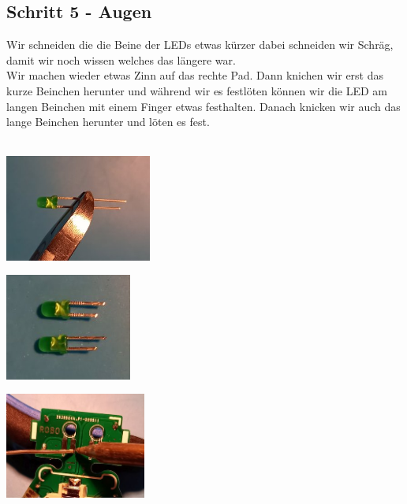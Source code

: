 \documentclass[a4paper]{article}
\begin{document}
\subsection{Schritt 5 - Augen}
Wir schneiden die die Beine der LEDs etwas kürzer dabei schneiden wir Schräg, damit wir noch wissen welches das längere war.\\ Wir machen wieder etwas Zinn auf das rechte Pad. Dann knichen wir erst das kurze Beinchen herunter und während wir es festlöten können wir die LED am langen Beinchen mit einem Finger etwas festhalten. Danach knicken wir auch das lange Beinchen herunter und löten es fest.\\
\ \\
\begin{minipage}[t]{0.33\textwidth}
  \centering
  \includegraphics[height=3.5cm]{../pictures/LED4.jpg}
  \label{img:LED4}
  \end{minipage}
\begin{minipage}[t]{0.33\textwidth}
  \centering
  \includegraphics[height=3.5cm]{../pictures/LED5.jpg}
  \label{img:LED5}
\end{minipage}
\begin{minipage}[t]{0.33\textwidth}
  \centering
  \includegraphics[height=3.5cm]{../pictures/LED6.jpg}
  \label{img:LED6}
\end{minipage}
\ \\
\end{document}
